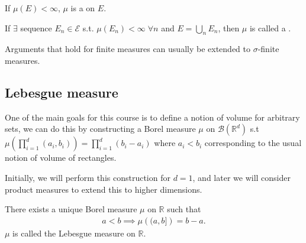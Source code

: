 \begin{definition}
	If $\mu(E) < \infty$, $\mu$ is a  on $E$.
\end{definition}

\begin{definition}
	If $\exists$ sequence $E_n \in \mathcal{E}$ s.t. $\mu(E_n) < \infty \; \forall n$ and $E = \bigcup_n E_n$, then $\mu$ is called a .
\end{definition}

\begin{remark}
	Arguments that hold for finite measures can usually be extended to $\sigma$-finite measures.
\end{remark}

\subsection{Lebesgue measure}
One of the main goals for this course is to define a notion of volume for arbitrary sets, we can do this by constructing a Borel measure $\mu$ on $\mathcal{B}(\mathbb{R}^d)$ s.t $\mu \left( \prod_{i=1}^d (a_i, b_i) \right) = \prod_{i=1}^d (b_i - a_i)$ where $a_i < b_i$ corresponding to the usual notion of volume of rectangles.

Initially, we will perform this construction for $d = 1$, and later we will consider product measures to extend this to higher dimensions.

\begin{theorem}
	There exists a unique Borel measure $\mu$ on $\mathbb R$ such that
	\begin{align*}
		a < b \implies \mu \left( (a,b] \right) = b - a. \tag{$\dagger$}
	\end{align*}
	$\mu$ is called the Lebesgue measure on $\mathbb{R}$.
\end{theorem}

